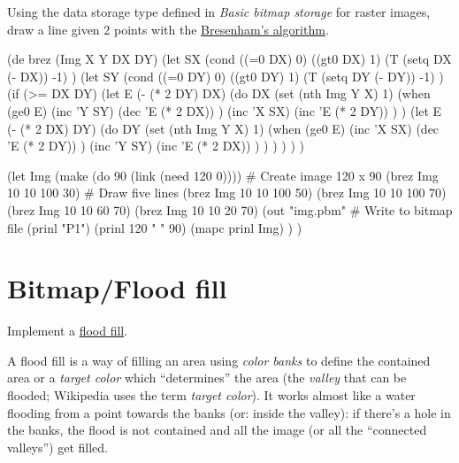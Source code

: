 Using the data storage type defined in \emph{Basic bitmap storage}
for raster images, draw a line given 2 points with the
\href{http://en.wikipedia.org/wiki/Bresenham\%27s\_line\_algorithm}{Bresenham's
algorithm}.

\begin{wideverbatim}

(de brez (Img X Y DX DY)
   (let SX
      (cond
         ((=0 DX) 0)
         ((gt0 DX) 1)
         (T (setq DX (- DX)) -1) )
      (let SY
         (cond
            ((=0 DY) 0)
            ((gt0 DY) 1)
            (T (setq DY (- DY)) -1) )
         (if (>= DX DY)
            (let E (- (* 2 DY) DX)
               (do DX
                  (set (nth Img Y X) 1)
                  (when (ge0 E)
                     (inc 'Y SY)
                     (dec 'E (* 2 DX)) )
                  (inc 'X SX)
                  (inc 'E (* 2 DY)) ) )
            (let E (- (* 2 DX) DY)
               (do DY
                  (set (nth Img Y X) 1)
                  (when (ge0 E)
                     (inc 'X SX)
                     (dec 'E (* 2 DY)) )
                  (inc 'Y SY)
                  (inc 'E (* 2 DX)) ) ) ) ) ) )

(let Img (make (do 90 (link (need 120 0))))        # Create image 120 x 90
   (brez Img 10 10 100 30)                         # Draw five lines
   (brez Img 10 10 100 50)
   (brez Img 10 10 100 70)
   (brez Img 10 10 60 70)
   (brez Img 10 10 20 70)
   (out "img.pbm"                                  # Write to bitmap file
      (prinl "P1")
      (prinl 120 " " 90)
      (mapc prinl Img) ) )

\end{wideverbatim}

\pagebreak{}
\section*{Bitmap/Flood fill}


Implement a \href{http://en.wikipedia.org/wiki/flood\_fill}{flood fill}.

A flood fill is a way of filling an area using \emph{color banks} to
define the contained area or a \emph{target color} which ``determines''
the area (the \emph{valley} that can be flooded; Wikipedia uses the term
\emph{target color}). It works almost like a water flooding from a point
towards the banks (or: inside the valley): if there's a hole in the
banks, the flood is not contained and all the image (or all the
``connected valleys'') get filled.

